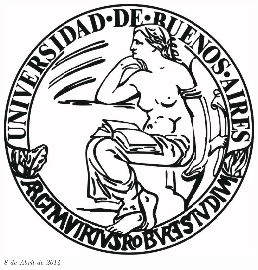 \documentclass{article}
\begin{document}
\begin{titlepage}
\includegraphics[scale=0.5]{img/UBA.jpg}\\[1cm] %


{\large \text \em {8 de Abril de 2014}}\\[3cm] %
 

\vfill %

\end{titlepage}

\tableofcontents

\newpage
\end{document}
